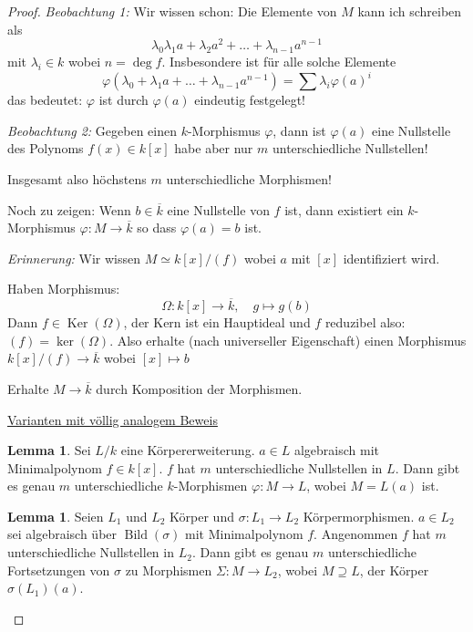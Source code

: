 \documentclass[12pt,parskip=full]{scrartcl}
\newcommand{\heading}{\underline}
\theoremstyle{definition}
\newtheorem{lemma}[theorem]{Lemma}
\theoremstyle{remark}
\begin{document}
	\begin{proof}
		\textit{Beobachtung 1:} Wir wissen schon: Die Elemente von $M$ kann ich schreiben als
		\begin{equation*}
			\lambda_0 \lambda_1 a + \lambda_2 a^2 + \dots + \lambda_{n-1} a^{n-1}
		\end{equation*}
		mit $\lambda_i \in k$ wobei $n = \deg f$. Insbesondere ist für alle solche Elemente
		\begin{equation*}
			\varphi(\lambda_0 + \lambda_1 a + \dots + \lambda_{n-1} a^{n-1}) = \sum \lambda_i \varphi(a)^i
		\end{equation*}
		das bedeutet: $\varphi$ ist durch $\varphi(a)$ eindeutig festgelegt!
		
		\textit{Beobachtung 2:} Gegeben einen $k$-Morphismus $\varphi$, dann ist $\varphi(a)$ eine Nullstelle des Polynoms $f(x) \in k[x]$ habe aber nur $m$ unterschiedliche Nullstellen!
		
		Insgesamt also höchstens $m$ unterschiedliche Morphismen!
		
		Noch zu zeigen: Wenn $b \in \overline{k}$ eine Nullstelle von $f$ ist, dann existiert ein $k$-Morphismus $\varphi: M \to \overline{k}$ so dass $\varphi(a) = b$ ist.
		
		\textit{Erinnerung:} Wir wissen $M \simeq k[x]/(f)$ wobei $a$ mit $[x]$ identifiziert wird.
		
		Haben Morphismus:
		\begin{equation*}
			\Omega: k[x] \to \overline{k}, \quad g \mapsto g(b)
		\end{equation*}
		Dann $f \in \operatorname{Ker}(\Omega)$, der Kern ist ein Hauptideal und $f$ reduzibel also: $(f) = \operatorname{ker}(\Omega)$. Also erhalte (nach universeller Eigenschaft) einen Morphismus $k[x]/(f) \to \overline{k}$ wobei $[x] \mapsto b$
		
		Erhalte $M \to \overline{k}$ durch Komposition der Morphismen.
		
		\heading{Varianten mit völlig analogem Beweis}
		
		\begin{lemma}
			Sei $L/k$ eine Körpererweiterung. $a \in L$ algebraisch mit Minimalpolynom $f \in k[x]$. $f$ hat $m$ unterschiedliche Nullstellen in $L$. Dann gibt es genau $m$ unterschiedliche $k$-Morphismen $\varphi: M \to L$, wobei $M = L(a)$ ist.
		\end{lemma}
	
		\begin{lemma}
			Seien $L_1$ und $L_2$ Körper und $\sigma: L_1 \to L_2$ Körpermorphismen. $a \in L_2$ sei algebraisch über $\operatorname{Bild}(\sigma)$ mit Minimalpolynom $f$. Angenommen $f$ hat $m$ unterschiedliche Nullstellen in $L_2$. Dann gibt es genau $m$ unterschiedliche Fortsetzungen von $\sigma$ zu Morphismen $\Sigma: M \to L_2$, wobei $M \supseteq L$, der Körper $\sigma(L_1)(a)$.
		\end{lemma}
	\end{proof}
\end{document}
